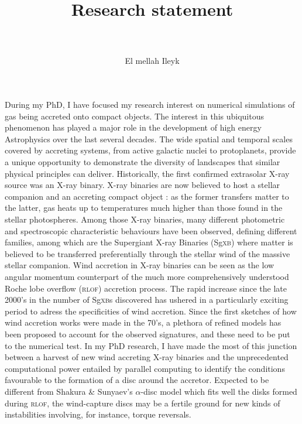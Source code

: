 \documentclass[a4paper,12pt,onecolumn]{article}
\title{	
\vspace*{-2cm}
\normalfont \tiny 
\horrule{0.5pt} \\[0.4cm] %
\huge Research statement \\ %
\horrule{2pt} \\[0.5cm] %
}
\author{E{\sc l mellah} Ileyk} %
\date{\tiny }%
\begin{document}


\maketitle
\thispagestyle{empty}

\indent During my PhD, I have focused my research interest on numerical simulations of gas being accreted onto compact objects. The interest in this ubiquitous phenomenon has played a major role in the development of high energy Astrophysics over the last several decades. The wide spatial and temporal scales covered by accreting systems, from active galactic nuclei to protoplanets, provide a unique opportunity to demonstrate the diversity of landscapes that similar physical principles can deliver. Historically, the first confirmed extrasolar X-ray source was an X-ray binary. X-ray binaries are now believed to host a stellar companion and an accreting compact object : as the former transfers matter to the latter, gas heats up to temperatures much higher than those found in the stellar photospheres. Among those X-ray binaries, many different photometric and spectroscopic characteristic behaviours have been observed, defining different families, among which are the Supergiant X-ray Binaries (Sg\textsc{xb}) where matter is believed to be transferred preferentially through the stellar wind of the massive stellar companion. Wind accretion in X-ray binaries can be seen as the low angular momentum counterpart of the much more comprehensively understood Roche lobe overflow (\textsc{rlof}) accretion process. The rapid increase since the late 2000's in the number of Sg\textsc{xb}s discovered \citep{Walter15} has ushered in a particularly exciting period to adress the specificities of wind accretion. Since the first sketches of how wind accretion works were made in the 70's, a plethora of refined models has been proposed to account for the observed signatures, and these need to be put to the numerical test. In my PhD research, I have made the most of this junction between a harvest of new wind accreting X-ray binaries and the unprecedented computational power entailed by parallel computing to identify the conditions favourable to the formation of a disc around the accretor. Expected to be different from Shakura \& Sunyaev's $\alpha$-disc model \citep{Shakura1973} which fits well the disks formed during \textsc{rlof}, the wind-capture discs may be a fertile ground for new kinds of instabilities involving, for instance, torque reversals.\\
\end{document}

